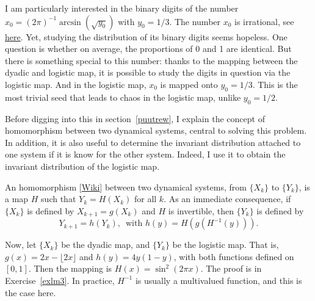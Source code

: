 \documentclass[oneside,10pt]{book}
\begin{document}
 I am particularly interested in the binary digits of the number
 $x_0=(2\pi)^{-1}\arcsin(\sqrt{y_0})$ with $y_0=1/3$.
The number $x_0$ is irrational, see \href{https://mathoverflow.net/questions/441714/does-x-0-1-3-lead-to-periodicity-in-the-logistic-map-x-k1-4x-k1-x-k/}{here}. Yet, studying the distribution of its binary digits seems hopeless. One question is whether
 on average, the proportions of 0 and 1 are identical. But there is something special to this number: thanks to the mapping between the dyadic and logistic map, it is possible to study the digits in question via the logistic map. And in the logistic map, $x_0$ is mapped onto $y_0 = 1/3$. This is the most trivial seed that leads to chaos in the logistic map, unlike $y_0=1/2$.

Before digging into this in section~\ref{puutrew}, I explain the concept of
 homomorphism between two dynamical systems, central to solving this problem. In addition, it is also useful to determine the
\textcolor{index}{invariant distribution} attached to one system if it is know for the other system. Indeed,
 I use it to obtain the invariant distribution of the logistic map.

An \textcolor{index}{homomorphism} [\href{https://en.wikipedia.org/wiki/homomorphism}{Wiki}]  between
 two dynamical systems, from $\{X_k\}$ to $\{Y_k\}$,  is a map $H$ such that $Y_k=H(X_k)$ for all $k$.
 As an immediate consequence, if $\{X_k\}$ is defined by $X_{k+1}=g(X_k)$ and $H$ is invertible, then $\{Y_k\}$ is defined
 by
$$
Y_{k+1}=h(Y_k), \, \text{ with } h(y)= H(g(H^{-1}(y))).
$$


Now, let $\{X_k\}$ be the dyadic map, and $\{Y_k\}$ be the logistic map. That is, $g(x) = 2x - \lfloor 2x \rfloor$ and
 $h(y) = 4y(1-y)$, with both functions defined on $[0, 1]$. Then the mapping is $H(x) =  \sin^2(2\pi x)$. The proof is in
 Exercise~\ref{exlm3}. In practice, $H^{-1}$ is usually a multivalued function, and this is the case here.
\end{document}
